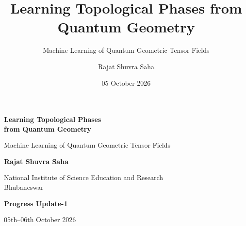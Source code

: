 \documentclass[aspectratio=169,11pt]{beamer}
\title[Learning Topological Phases]{Learning Topological Phases from Quantum Geometry}
\subtitle{Machine Learning of Quantum Geometric Tensor Fields}
\author[Rajat Shuvra Saha]{Rajat Shuvra Saha}
\institute[NISER]{National Institute of Science Education and Research\\Bhubaneswar}
\date{05 October 2026}
\begin{document}
\begin{frame}[plain]
\centering
\vspace{0.55cm}
{\LARGE\bfseries Learning Topological Phases\\from Quantum Geometry}

\vspace{0.30cm}
{\large Machine Learning of Quantum Geometric Tensor Fields}

\vspace{0.75cm}
{\large\bfseries Rajat Shuvra Saha}

\vspace{0.15cm}
National Institute of Science Education and Research\\Bhubaneswar

\vfill
{\large\bfseries Progress Update-1}

\vspace{0.12cm}
05th--06th October 2026
\end{frame}
\end{document}
